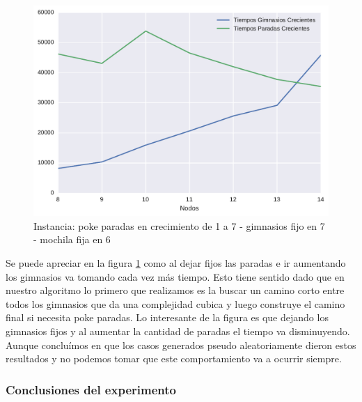 \begin{figure}[H]
  \begin{center}
    \includegraphics[scale=0.8]{imagenes/ej2test12bishvsbttiempos.pdf}
    \caption{Instancia: poke paradas en crecimiento de 1 a 7 - gimnasios fijo en 7 - mochila fija en 6}
    \label{ej2test12bis}
  \end{center}
\end{figure}


Se puede apreciar en la figura \ref{ej2test12bis} como al dejar fijos las paradas e ir aumentando los gimnasios va tomando cada vez más tiempo. Esto tiene sentido dado que en nuestro algoritmo lo primero que realizamos es la buscar un camino corto entre todos los gimnasios que da una complejidad cubica y luego construye el camino final si necesita poke paradas. Lo interesante de la figura es que dejando los gimnasios fijos y al aumentar la cantidad de paradas el tiempo va disminuyendo. Aunque concluímos en que los casos generados pseudo aleatoriamente dieron estos resultados y no podemos tomar que este comportamiento va a ocurrir siempre.

\subsubsection{}
\subsubsection{}
\subsubsection{}

\subsubsection{Conclusiones del experimento}